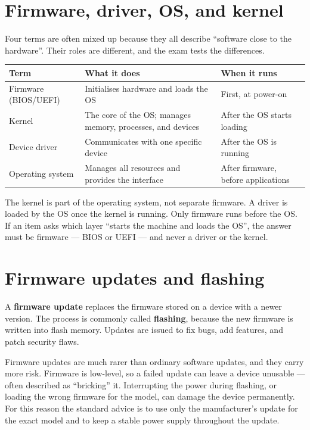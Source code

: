 \documentclass[11pt]{article}
\begin{document}
\section{Firmware, driver, OS, and kernel}
Four terms are often mixed up because they all describe ``software close to
the hardware''. Their roles are different, and the exam tests the
differences.

\begin{center}
\begin{tabular}{p{}p{}p{}}
\toprule
\textbf{Term} & \textbf{What it does} & \textbf{When it runs} \\
\midrule
Firmware (BIOS/UEFI) & Initialises hardware and loads the OS & First, at power-on \\
Kernel & The core of the OS; manages memory, processes, and devices & After the OS starts loading \\
Device driver & Communicates with one specific device & After the OS is running \\
Operating system & Manages all resources and provides the interface & After firmware, before applications \\
\bottomrule
\end{tabular}
\end{center}

The kernel is part of the operating system, not separate firmware. A driver
is loaded by the OS once the kernel is running. Only firmware runs before the
OS. If an item asks which layer ``starts the machine and loads the OS'', the
answer must be firmware --- BIOS or UEFI --- and never a driver or the
kernel.

\section{Firmware updates and flashing}
A \textbf{firmware update} replaces the firmware stored on a device with a
newer version. The process is commonly called \textbf{flashing}, because the
new firmware is written into flash memory. Updates are issued to fix bugs,
add features, and patch security flaws.

Firmware updates are much rarer than ordinary software updates, and they
carry more risk. Firmware is low-level, so a failed update can leave a device
unusable --- often described as ``bricking'' it. Interrupting the power
during flashing, or loading the wrong firmware for the model, can damage the
device permanently. For this reason the standard advice is to use only the
manufacturer's update for the exact model and to keep a stable power supply
throughout the update.
\end{document}
